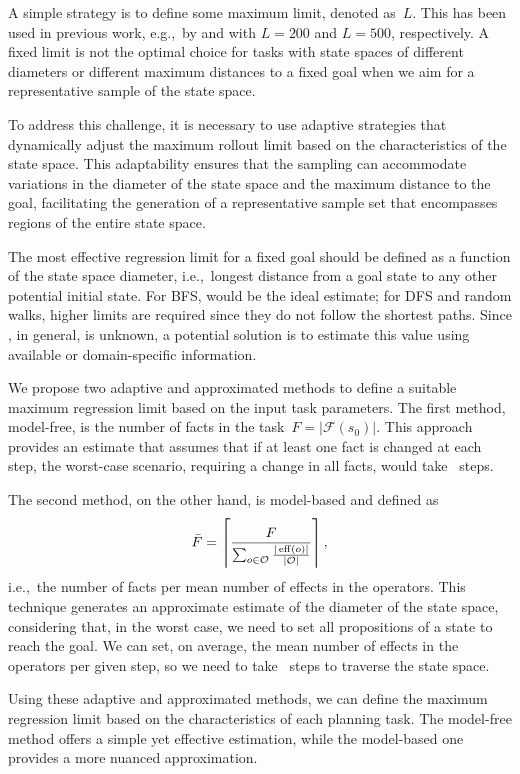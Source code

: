 A simple strategy is to define some maximum limit, denoted as~$L$. This has been used in previous work, e.g.,~by \citet{yu2020learning} and \citet{otoole2022sampling} with $L=200$ and $L=500$, respectively. A fixed limit is not the optimal choice for tasks with state spaces of different diameters or different maximum distances to a fixed goal when we aim for a representative sample of the state space.

To address this challenge, it is necessary to use adaptive strategies that dynamically adjust the maximum rollout limit based on the characteristics of the state space. This adaptability ensures that the sampling can accommodate variations in the diameter of the state space and the maximum distance to the goal, facilitating the generation of a representative sample set that encompasses regions of the entire state space.

The most effective regression limit for a fixed goal should be defined as a function of the state space diameter, i.e.,~longest distance \ssdiameter from a goal state to any other potential initial state. For BFS, \ssdiameter would be the ideal estimate; for DFS and random walks, higher limits are required since they do not follow the shortest paths. Since \ssdiameter, in general, is unknown, a potential solution is to estimate this value using available or domain-specific information.

We propose two adaptive and approximated methods to define a suitable maximum regression limit based on the input task parameters. The first method, model-free, is the number of facts in the task~$F=|\mathcal{F}(s_0)|$. This approach provides an estimate that assumes that if at least one fact is changed at each step, the worst-case scenario, requiring a change in all facts, would take \facts~steps.

The second method, on the other hand, is model-based and defined as~$$\bar F=\left\lceil \frac{F}{\sum_{o\in \mathcal{O}} \frac{|\operatorname{eff}(o)|}{|\mathcal{O}|}}\right\rceil,$$ i.e.,~the number of facts per mean number of effects in the operators. This technique generates an approximate estimate of the diameter of the state space, considering that, in the worst case, we need to set all propositions of a state to reach the goal. We can set, on average, the mean number of effects in the operators per given step, so we need to take \meanfx~steps to traverse the state space.

Using these adaptive and approximated methods, we can define the maximum regression limit based on the characteristics of each planning task. The model-free method offers a simple yet effective estimation, while the model-based one provides a more nuanced approximation.

